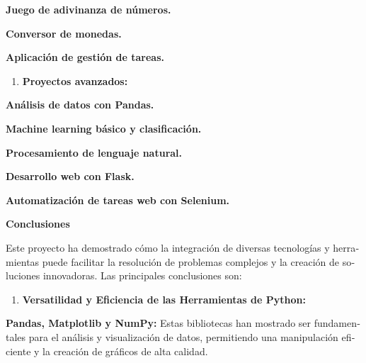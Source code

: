 \documentclass[letterpaper]{article}
\newcommand\textstyleStrong[1]{\textbf{#1}}
\begin{document}
{
\textstyleStrong{\textmd{Juego de adivinanza de números.}}}

{
\textstyleStrong{\textmd{Conversor de monedas.}}}

{
\textstyleStrong{\textmd{Aplicación de gestión de tareas.}}}

\begin{enumerate}[resume*=listWWNumx]
\item {
\textstyleStrong{Proyectos avanzados:}}
\end{enumerate}
{
\textstyleStrong{\textmd{Análisis de datos con Pandas.}}}

{
\textstyleStrong{\textmd{Machine learning básico y clasificación.}}}

{
\textstyleStrong{\textmd{Procesamiento de lenguaje natural.}}}

{
\textstyleStrong{\textmd{Desarrollo web con Flask.}}}

{
\textstyleStrong{\textmd{Automatización de tareas web con Selenium}.}}


\bigskip


\bigskip


\bigskip


\bigskip


\bigskip

\bigskip
\bigskip
\bigskip
\bigskip
\bigskip
\bigskip
\bigskip
\bigskip
\bigskip
\bigskip
\bigskip
\bigskip
\bigskip
\bigskip
{
\textbf{Conclusiones}}

{
\foreignlanguage{spanish}{Este proyecto ha demostrado cómo la integración de diversas tecnologías y herramientas puede
facilitar la resolución de problemas complejos y la creación de soluciones innovadoras. Las principales conclusiones
son:}}

\begin{enumerate}[series=listWWNumxi,label=\arabic*.,ref=\arabic*]
\item {
\foreignlanguage{spanish}{\textbf{Versatilidad y Eficiencia de las Herramientas de Python:}}}
\end{enumerate}
{
\foreignlanguage{spanish}{\textbf{Pandas, Matplotlib y NumPy:}}\foreignlanguage{spanish}{ Estas bibliotecas han mostrado
ser fundamentales para el análisis y visualización de datos, permitiendo una manipulación eficiente y la creación de
gráficos de alta calidad.}}
\end{document}
